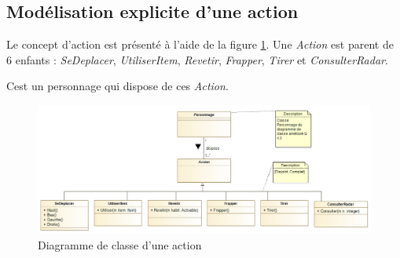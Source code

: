 
\subsection{Modélisation explicite d'une action}
\label{sec:question11}

Le concept d'action est présenté à l'aide de la figure \ref{fig:action}. Une \emph{Action} est parent de 6 enfants : \emph{SeDeplacer}, \emph{UtiliserItem}, \emph{Revetir}, \emph{Frapper}, \emph{Tirer} et \emph{ConsulterRadar}.

Cest un personnage qui dispose de ces \emph{Action}.

\begin{figure}
	\centering
	\includegraphics[width=500pt]{assets/class__Action}
	\caption{Diagramme de classe d'une action}
	\label{fig:action}
\end{figure}